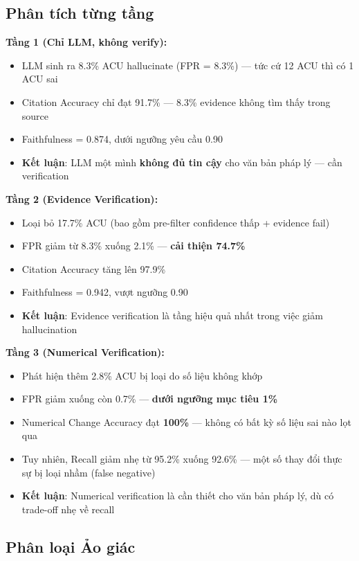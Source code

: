 \subsection{Phân tích từng tầng}

\textbf{Tầng 1 (Chỉ LLM, không verify):}
\begin{itemize}
    \item LLM sinh ra 8.3\% ACU hallucinate (FPR = 8.3\%) — tức cứ 12 ACU thì có 1 ACU sai
    \item Citation Accuracy chỉ đạt 91.7\% — 8.3\% evidence không tìm thấy trong source
    \item Faithfulness = 0.874, dưới ngưỡng yêu cầu 0.90
    \item \textbf{Kết luận}: LLM một mình \textbf{không đủ tin cậy} cho văn bản pháp lý — cần verification
\end{itemize}

\textbf{Tầng 2 (Evidence Verification):}
\begin{itemize}
    \item Loại bỏ 17.7\% ACU (bao gồm pre-filter confidence thấp + evidence fail)
    \item FPR giảm từ 8.3\% xuống 2.1\% — \textbf{cải thiện 74.7\%}
    \item Citation Accuracy tăng lên 97.9\%
    \item Faithfulness = 0.942, vượt ngưỡng 0.90
    \item \textbf{Kết luận}: Evidence verification là tầng hiệu quả nhất trong việc giảm hallucination
\end{itemize}

\textbf{Tầng 3 (Numerical Verification):}
\begin{itemize}
    \item Phát hiện thêm 2.8\% ACU bị loại do số liệu không khớp
    \item FPR giảm xuống còn 0.7\% — \textbf{dưới ngưỡng mục tiêu 1\%}
    \item Numerical Change Accuracy đạt \textbf{100\%} — không có bất kỳ số liệu sai nào lọt qua
    \item Tuy nhiên, Recall giảm nhẹ từ 95.2\% xuống 92.6\% — một số thay đổi thực sự bị loại nhầm (false negative)
    \item \textbf{Kết luận}: Numerical verification là cần thiết cho văn bản pháp lý, dù có trade-off nhẹ về recall
\end{itemize}

\subsection{Phân loại Ảo giác}

